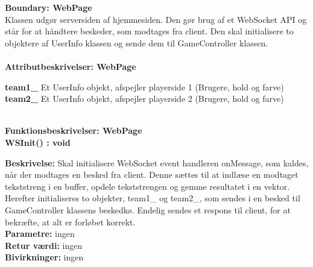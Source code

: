 \documentclass[Arkitektur/System_main.tex]{subfiles}
\begin{document}
{\large\textbf{Boundary: WebPage}}\\
Klassen udgør serversiden af hjemmesiden. Den gør brug af et WebSocket API og står for at håndtere beskeder, som modtages fra
client. Den skal initialisere to objektere af UserInfo klassen og sende dem til GameController klassen.\\
\\{\large\textbf{Attributbeskrivelser: WebPage}}
\begin{adjustwidth}{1cm}{0pt}
\textbf{team1\_} Et UserInfo objekt, afspejler playerside 1 (Brugere, hold og farve) \\[0.2cm]
\textbf{team2\_} Et UserInfo objekt, afspejler playerside 2 (Brugere, hold og farve) \\[0.2cm]
\end{adjustwidth}
\\
{\large\textbf{Funktionsbeskrivelser: WebPage}}\\[0.2cm]
\textbf{WSInit() : void}
\begin{adjustwidth}{1cm}{0pt}
\textbf{Beskrivelse:} Skal initialisere WebSocket event handleren onMessage, som kaldes, når der modtages en besked fra client. Denne sættes til at indlæse en modtaget tekststreng i en buffer, opdele tekststrengen og gemme resultatet i en vektor. Herefter initialiseres to objekter, team1\_ og team2\_, som sendes i en besked til GameController klassens beskedkø. Endelig sendes et respons til client, for at bekræfte, at alt er forløbet korrekt.\\
\textbf{Parametre:} ingen \\[0.2cm]
\textbf{Retur værdi:} ingen \\[0.2cm]
\textbf{Bivirkninger:} ingen \\[0.2cm]
\end{adjustwidth}
\end{document}
